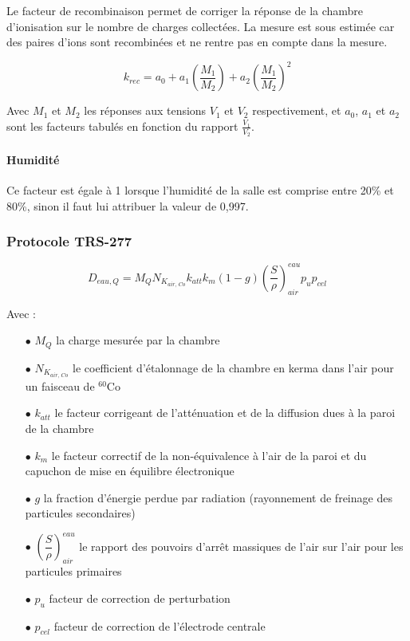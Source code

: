\documentclass{article}
\begin{document}
Le facteur de recombinaison permet de corriger la réponse de la chambre d'ionisation sur le nombre de charges collectées. La mesure est sous estimée car des paires d'ions sont recombinées et ne rentre pas en compte dans la mesure.

\begin{equation}
  k_{rec} = a_0 + a_1 \left(\dfrac{M_1}{M_2}\right) + a_2 \left(\dfrac{M_1}{M_2}\right) ^2
  \label{eq_rec}
\end{equation}

Avec $M_1$ et $M_2$ les réponses aux tensions $V_1$ et $V_2$ respectivement, et $a_0$, $a_1$ et $a_2$ sont les facteurs tabulés en fonction du rapport $\frac{V_1}{V_2}$.

\paragraph{Humidité}

Ce facteur est égale à 1 lorsque l'humidité de la salle est comprise entre 20\% et 80\%, sinon il faut lui attribuer la valeur de 0,997.

\subsubsection{Protocole TRS-277}

\begin{equation}
  D_{eau, Q} = M_Q N_{K_{air, \, Co}} k_{att} k_{m} (1-g) \left(\dfrac{S}{\rho}\right)^{eau}_{air} p_u p_{cel}
  \label{eq_dose_277}
\end{equation}

Avec :

\begin{itemize}
  \item[$\bullet$] $M_Q$ la charge mesurée par la chambre
  \item[$\bullet$] $N_{K_{air, \, Co}}$ le coefficient d'étalonnage de la chambre en kerma dans l'air pour un faisceau de $^{60}$Co
  \item[$\bullet$] $k_{att}$ le facteur corrigeant de l'atténuation et de la diffusion dues à la paroi de la chambre
  \item[$\bullet$] $k_m$ le facteur correctif de la non-équivalence à l'air de la paroi et du capuchon de mise en équilibre électronique
  \item[$\bullet$] $g$ la fraction d'énergie perdue par radiation (rayonnement de freinage des particules secondaires)
  \item[$\bullet$] $\left(\dfrac{S}{\rho}\right) ^{eau}_{air}$ le rapport des pouvoirs d'arrêt massiques de l'air sur l'air pour les particules primaires
  \item[$\bullet$] $p_u$ facteur de correction de perturbation
  \item[$\bullet$] $p_{cel}$ facteur de correction de l'électrode centrale
\end{itemize}
\end{document}
